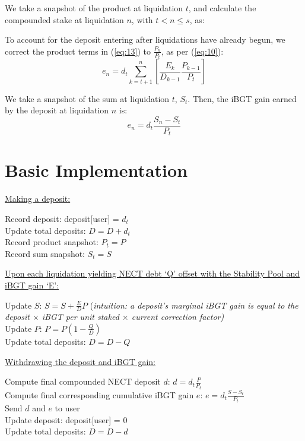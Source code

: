 \documentclass[reqno]{article}
\begin{document}
We take a snapshot of the product at liquidation $t$, and calculate the compounded stake at liquidation $n$, with $t < n \leq s$, as:

\bigskip
To account for the deposit entering after liquidations have already begun, we correct the product terms in (\ref{eq:13}) to $\frac{P_n}{P_t}$, as per (\ref{eq:10}):
\begin{equation} 
    e_n = d_t\sum^n_{k=t+1}\left[\frac{E_k}{D_{k-1}}\frac{P_{k-1}}{P_t}\right]
\end{equation}

\bigskip
We take a snapshot of the sum at liquidation $t$, $S_t$. Then, the iBGT gain earned by the deposit at liquidation $n$ is:
\begin{equation} 
e_n=d_t\frac{S_n-S_t}{P_t}
\end{equation}

\bigskip
\section{Basic Implementation}
\underline{Making a deposit:}

Record deposit: deposit[user] = $d_t$\\
Update total deposits: $D = D + d_t$\\
Record product snapshot: $P_t = P$\\
Record sum snapshot: $S_t = S$

\bigskip
\underline{Upon each liquidation yielding NECT debt ‘Q’ offset with the Stability Pool and iBGT gain ‘E’:}

Update $S$: $S = S + \frac{E}{D}P$ (\textit{intuition: a deposit’s marginal iBGT gain is equal to the deposit $\times$ iBGT per unit staked $\times$ current correction factor)}\\
Update $P$: $P = P(1 - \frac{Q}{D})$\\
Update total deposits: $D = D - Q$

\bigskip
\underline{Withdrawing the deposit and iBGT gain:}

Compute final compounded NECT deposit $d$: $d = d_t\frac{P}{P_t}$\\
Compute final corresponding cumulative iBGT gain $e$: $e = d_t\frac{S - S_t}{P_t}$\\
Send $d$ and $e$ to user\\
Update deposit: deposit[user] = 0\\
Update total deposits: $D = D - d$\\

\bigskip
\end{document}
